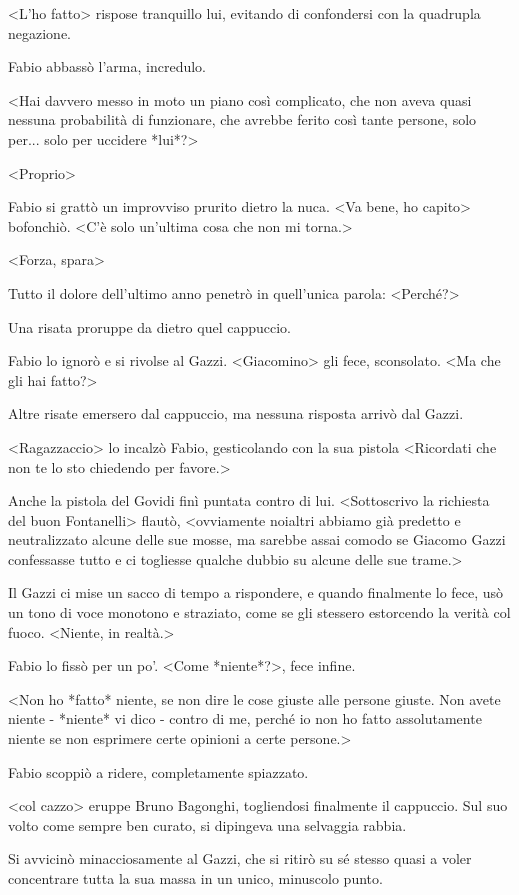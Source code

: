 <L'ho fatto> rispose tranquillo lui, evitando di confondersi con la quadrupla negazione.

Fabio abbassò l'arma, incredulo.

<Hai davvero messo in moto un piano così complicato, che non aveva quasi nessuna probabilità di funzionare, che avrebbe ferito così tante persone, solo per... solo per uccidere *lui*?>

<Proprio>

Fabio si grattò un improvviso prurito dietro la nuca. <Va bene, ho capito> bofonchiò. <C'è solo un'ultima cosa che non mi torna.>

<Forza, spara>

Tutto il dolore dell'ultimo anno penetrò in quell'unica parola: <Perché?>

Una risata proruppe da dietro quel cappuccio.

Fabio lo ignorò e si rivolse al Gazzi. <Giacomino> gli fece, sconsolato. <Ma che gli hai fatto?>

Altre risate emersero dal cappuccio, ma nessuna risposta arrivò dal Gazzi.

<Ragazzaccio> lo incalzò Fabio, gesticolando con la sua pistola <Ricordati che non te lo sto chiedendo per favore.>

Anche la pistola del Govidi finì puntata contro di lui. <Sottoscrivo la richiesta del buon Fontanelli> flautò, <ovviamente noialtri abbiamo già predetto e neutralizzato alcune delle sue mosse, ma sarebbe assai comodo se Giacomo Gazzi confessasse tutto e ci togliesse qualche dubbio su alcune delle sue trame.>

Il Gazzi ci mise un sacco di tempo a rispondere, e quando finalmente lo fece, usò un tono di voce monotono e straziato, come se gli stessero estorcendo la verità col fuoco. <Niente, in realtà.>

Fabio lo fissò per un po'. <Come *niente*?>, fece infine.

<Non ho *fatto* niente, se non dire le cose giuste alle persone giuste. Non avete niente - *niente* vi dico - contro di me, perché io non ho fatto assolutamente niente se non esprimere certe opinioni a certe persone.>

Fabio scoppiò a ridere, completamente spiazzato.

<col cazzo> eruppe Bruno Bagonghi, togliendosi finalmente il cappuccio. Sul suo volto come sempre ben curato, si dipingeva una selvaggia rabbia.

Si avvicinò minacciosamente al Gazzi, che si ritirò su sé stesso quasi a voler concentrare tutta la sua massa in un unico, minuscolo punto.

